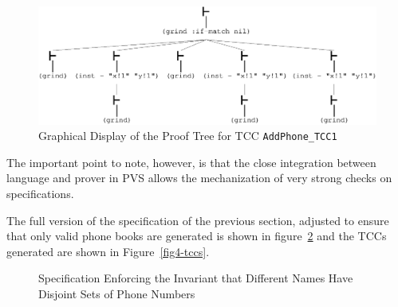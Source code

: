 \begin{figure}[htb]
\begin{center}
\includegraphics[width=\linewidth]{phone_4_AddPhone_TCC1}
\end{center}
\caption{\label{proof-pic}Graphical Display of the Proof Tree for
TCC {\tt AddPhone\_TCC1}}
\end{figure}

The important point to note, however, is that the close integration
between language and prover in PVS allows the mechanization of very
strong checks on specifications.

The full version of the specification of the previous section,
adjusted to ensure that only valid phone books are generated is shown
in figure~\ref{fig4} and the TCCs generated are shown in
Figure~\ref{fig4-tccs}.

\begin{figure}
\def\pvsdeclspacing{-2mm}

\caption{\label{fig4}Specification Enforcing the Invariant that
Different Names Have Disjoint Sets of Phone Numbers}
\end{figure}

